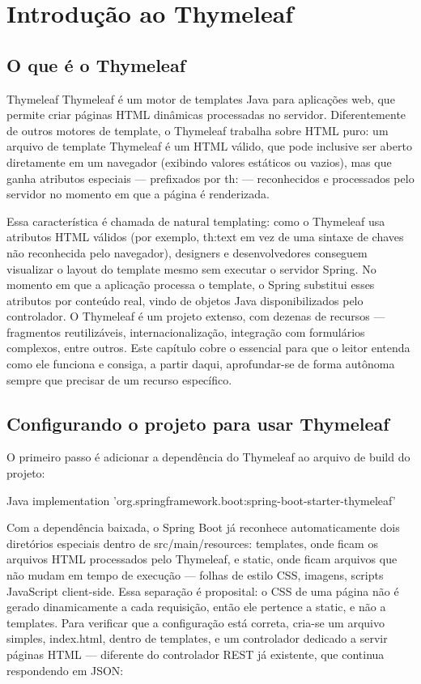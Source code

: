 \chapter{Introdução ao Thymeleaf}

\section{O que é o Thymeleaf}

\begin{infobox}{Thymeleaf}
Thymeleaf é um motor de templates Java para aplicações web, que permite criar páginas HTML dinâmicas processadas no servidor. Diferentemente de outros motores de template, o Thymeleaf trabalha sobre HTML puro: um arquivo de template Thymeleaf é um HTML válido, que pode inclusive ser aberto diretamente em um navegador (exibindo valores estáticos ou vazios), mas que ganha atributos especiais — prefixados por th: — reconhecidos e processados pelo servidor no momento em que a página é renderizada.
\end{infobox}

Essa característica é chamada de natural templating: como o Thymeleaf usa atributos HTML válidos (por exemplo, th:text em vez de uma sintaxe de chaves não reconhecida pelo navegador), designers e desenvolvedores conseguem visualizar o layout do template mesmo sem executar o servidor Spring. No momento em que a aplicação processa o template, o Spring substitui esses atributos por conteúdo real, vindo de objetos Java disponibilizados pelo controlador. O Thymeleaf é um projeto extenso, com dezenas de recursos — fragmentos reutilizáveis, internacionalização, integração com formulários complexos, entre outros. Este capítulo cobre o essencial para que o leitor entenda como ele funciona e consiga, a partir daqui, aprofundar-se de forma autônoma sempre que precisar de um recurso específico.

\section{Configurando o projeto para usar Thymeleaf}

O primeiro passo é adicionar a dependência do Thymeleaf ao arquivo de build do projeto:

\begin{codebox}{Java}
implementation 'org.springframework.boot:spring-boot-starter-thymeleaf'
\end{codebox}

Com a dependência baixada, o Spring Boot já reconhece automaticamente dois diretórios especiais dentro de src/main/resources: templates, onde ficam os arquivos HTML processados pelo Thymeleaf, e static, onde ficam arquivos que não mudam em tempo de execução — folhas de estilo CSS, imagens, scripts JavaScript client-side. Essa separação é proposital: o CSS de uma página não é gerado dinamicamente a cada requisição, então ele pertence a static, e não a templates. Para verificar que a configuração está correta, cria-se um arquivo simples, index.html, dentro de templates, e um controlador dedicado a servir páginas HTML — diferente do controlador REST já existente, que continua respondendo em JSON:

